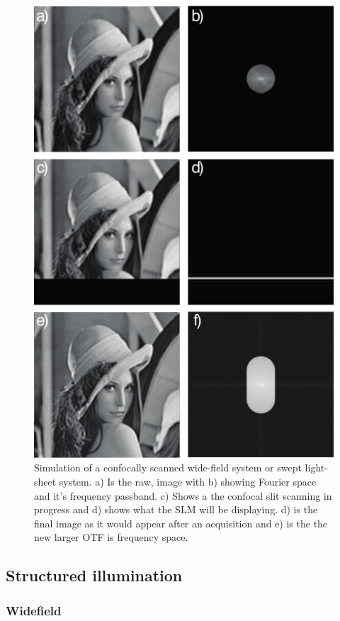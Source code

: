 \begin{figure}
  \centering
  \includegraphics{widefield_slit}
  \caption{Simulation of a confocally scanned wide-field system or swept light-sheet system. a) Is the raw, image with b) showing Fourier space and it's frequency passband.
  c) Shows a the confocal slit scanning in progress and d) shows what the SLM will be displaying.
  d) is the final image as it would appear after an acquisition and e) is the the new larger OTF is frequency space.
  }
  \label{fig:widefield_slit}
\end{figure}

\subsection{Structured illumination}

\subsubsection{Widefield}

